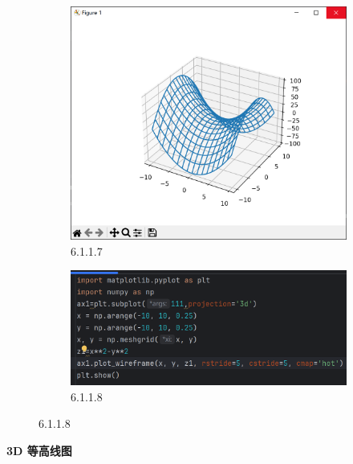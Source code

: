 \documentclass[12pt]{article}
\begin{document}
\begin{figure}[H]
    \centering
    \begin{subfigure}[b]{0.48\textwidth}
        \includegraphics[width=\textwidth]{3D exap Pic4.png} %
        \caption{6.1.1.7}
        \label{fig:line-graph2}
    \end{subfigure}
    \hfill
    \begin{subfigure}[b]{0.48\textwidth}
        \includegraphics[width=\textwidth]{3D exap program4.png} %
        \caption{6.1.1.8}
        \label{fig:line-graph2-pic2}
    \end{subfigure}
\end{figure}
\newpage
\textbf{\Large 3D 等高线图}
\end{document}

